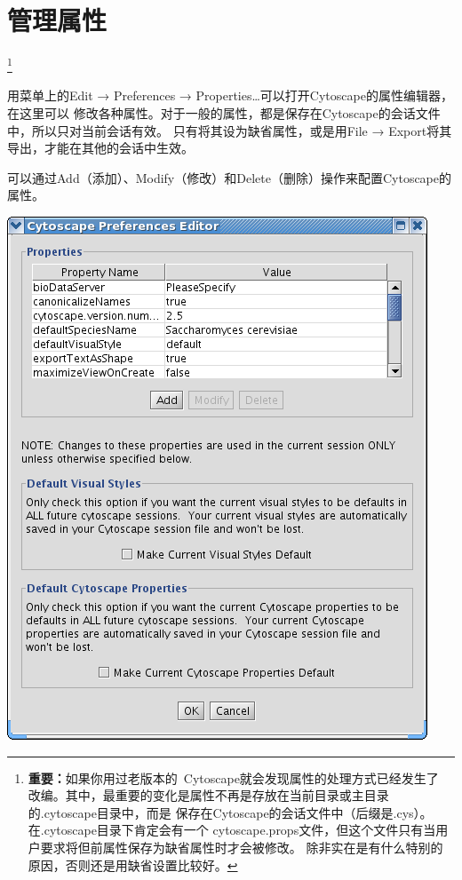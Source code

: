\section{管理属性}
\footnote{{\bf 重要：}如果你用过老版本的~Cytoscape就会发现属性的处理方式已经发生了
改编。其中，最重要的变化是属性不再是存放在当前目录或主目录的.cytoscape目录中，而是
保存在Cytoscape的会话文件中（后缀是.cys）。在.cytoscape目录下肯定会有一个
cytoscape.props文件，但这个文件只有当用户要求将但前属性保存为缺省属性时才会被修改。
除非实在是有什么特别的原因，否则还是用缺省设置比较好。}

用菜单上的Edit → Preferences → Properties…可以打开Cytoscape的属性编辑器，在这里可以
修改各种属性。对于一般的属性，都是保存在Cytoscape的会话文件中，所以只对当前会话有效。
只有将其设为缺省属性，或是用File → Export将其导出，才能在其他的会话中生效。

可以通过Add（添加）、Modify（修改）和Delete（删除）操作来配置Cytoscape的属性。
\begin{center}
\includegraphics[width=\textwidth]{images/prefs_editor.png} 
 \end{center}